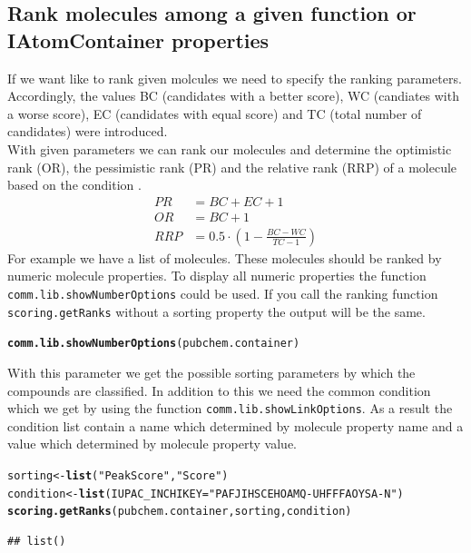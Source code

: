 \documentclass[12pt, a4paper]{scrartcl}\usepackage[]{graphicx}\usepackage[]{color}
\makeatletter
\newcommand{\hlstr}[1]{\textcolor[rgb]{0.192,0.494,0.8}{#1}}%
\newcommand{\hlstd}[1]{\textcolor[rgb]{0.345,0.345,0.345}{#1}}%
\newcommand{\hlkwb}[1]{\textcolor[rgb]{0.69,0.353,0.396}{#1}}%
\newcommand{\hlkwc}[1]{\textcolor[rgb]{0.333,0.667,0.333}{#1}}%
\newcommand{\hlkwd}[1]{\textcolor[rgb]{0.737,0.353,0.396}{\textbf{#1}}}%
\newenvironment{kframe}{%
 \def\at@end@of@kframe{}%
 \ifinner\ifhmode%
  \def\at@end@of@kframe{\end{minipage}}%
  \begin{minipage}{\columnwidth}%
 \fi\fi%
 \def\FrameCommand##1{\hskip\@totalleftmargin \hskip-\fboxsep
 \colorbox{shadecolor}{##1}\hskip-\fboxsep
     \hskip-\linewidth \hskip-\@totalleftmargin \hskip\columnwidth}%
 \MakeFramed {\advance\hsize-\width
   \@totalleftmargin\z@ \linewidth\hsize
   \@setminipage}}%
 {\par\unskip\endMakeFramed%
 \at@end@of@kframe}
\newenvironment{knitrout}{}{} %
\newcommand{\Rfunction}[1]{{\texttt{#1}}}
\makeatother
\begin{document}
\newpage
\subsection{Rank molecules among a given function or IAtomContainer properties}
If we want like to rank given molcules we need to specify the ranking parameters.
Accordingly, the values BC (candidates with a better score), WC (candiates
with a worse score), EC (candidates with equal score) and TC (total number of candidates) were introduced. \\[0.5em]
With given parameters we can rank our molecules and determine the optimistic rank (OR), 
the pessimistic rank (PR) and the relative rank (RRP) of a molecule based on the condition \cite{Wolf2010}.
\begin{align*}
  PR &= BC + EC + 1 \\
  OR &= BC + 1 \\
  RRP &= 0.5 \cdot (1-\frac{BC-WC}{TC-1})
\end{align*}
For example we have a list of molecules. These molecules should be ranked 
by numeric molecule properties. To display all numeric properties the function 
\Rfunction{comm.lib.showNumberOptions} could be used. If you call the ranking 
function \Rfunction{scoring.getRanks} without a sorting property the output will be the same.

\begin{knitrout}
\color{fgcolor}\begin{kframe}
\begin{alltt}
  \hlkwd{comm.lib.showNumberOptions}\hlstd{(pubchem.container)}
\end{alltt}
\end{kframe}
\end{knitrout}

With this parameter we get the possible sorting parameters by which the compounds are classified. 
In addition to this we need the common condition which we get by using the function 
\Rfunction{comm.lib.showLinkOptions}. As a result the condition list contain a name which determined by molecule property name
and a value which determined by molecule property value. 

\begin{knitrout}
\color{fgcolor}\begin{kframe}
\begin{alltt}
  \hlstd{sorting} \hlkwb{<-} \hlkwd{list}\hlstd{(}\hlstr{"PeakScore"}\hlstd{,}\hlstr{"Score"}\hlstd{)}
  \hlstd{condition} \hlkwb{<-} \hlkwd{list}\hlstd{(}\hlkwc{IUPAC_INCHIKEY}\hlstd{=}\hlstr{"PAFJIHSCEHOAMQ-UHFFFAOYSA-N"}\hlstd{)}
  \hlkwd{scoring.getRanks}\hlstd{(pubchem.container, sorting, condition)}
\end{alltt}
\begin{verbatim}
## list()
\end{verbatim}
\end{kframe}
\end{knitrout}
\end{document}
